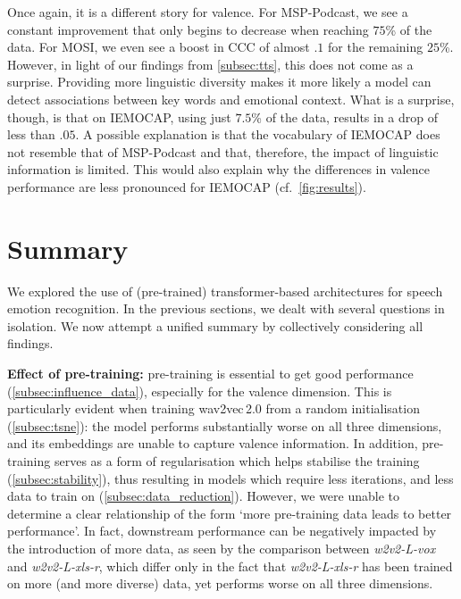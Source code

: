 \documentclass{article}
\newcommand\wvox{\mbox{\emph{w2v2-L-vox}}}
\newcommand\wxlsr{\mbox{\emph{w2v2-L-xls-r}}}
\newcommand\msppodcast{\mbox{MSP-Podcast}}
\newcommand\iemocap{\mbox{IEMOCAP}}
\newcommand\mosi{\mbox{MOSI}}
\newcommand{\wtov}{wav2vec\,2.0}
\newcommand{\cf}{{cf.\ }}
\begin{document}
Once again, it is a different story for valence. 
For {\msppodcast}, we see a constant improvement that only begins to decrease when reaching $75$\% of the data. For {\mosi}, we even see a boost in \ac{CCC} of almost $.1$ for the remaining $25$\%. 
However, in light of our findings from \cref{subsec:tts}, 
this does not come as a surprise. 
Providing more linguistic diversity makes it more likely a model can detect associations between key words and emotional context. 
What is a surprise, though, is that on {\iemocap}, using just $7.5$\% of the data, results in a drop of less than $.05$. 
A possible explanation is that the vocabulary of {\iemocap} does not resemble that of {\msppodcast} and that, therefore, the impact of linguistic information is limited. 
This would also explain why the differences in valence performance are less pronounced for {\iemocap} (\cf \cref{fig:results}).





\section{Summary}
\label{sec:summary}

We explored the use of (pre-trained) transformer-based architectures for speech emotion recognition.
In the previous sections, we dealt with several questions in isolation.
We now attempt a unified summary by collectively considering all findings.

\textbf{Effect of pre-training:}
pre-training is essential to get good performance (\cref{subsec:influence_data}),
especially for the valence dimension.
This is particularly evident
when training {\wtov} from a random initialisation (\cref{subsec:tsne}):
the model performs substantially worse on all three dimensions,
and its embeddings are unable to capture valence information.
In addition,
pre-training serves as a form of regularisation
which helps stabilise the training (\cref{subsec:stability}),
thus resulting in models which require less iterations,
and less data to train on (\cref{subsec:data_reduction}).
However, we were unable to determine a clear relationship of the form
`more pre-training data leads to better performance'.
In fact, downstream performance can be negatively impacted by the introduction of more data,
as seen by the comparison between {\wvox} and {\wxlsr},
which differ only in the fact that {\wxlsr} has been trained on more (and more diverse) data,
yet performs worse on all three dimensions.
\end{document}
